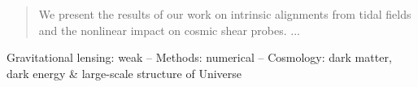 
\begin{abstract}
We present the results of our work on intrinsic alignments from tidal fields and the nonlinear impact on cosmic shear probes.
...
\end{abstract}

\begin{keywords}
Gravitational lensing: weak -- Methods: numerical -- Cosmology: dark matter, dark energy \& large-scale structure of Universe 
\end{keywords}